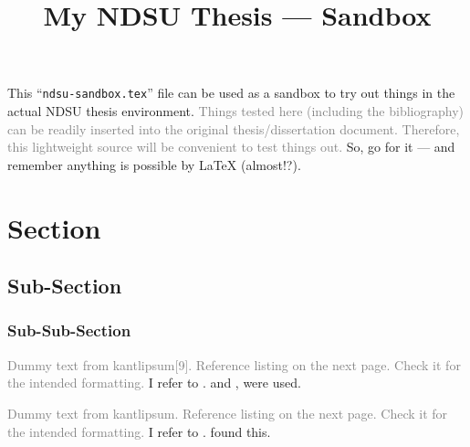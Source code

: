 \documentclass[12pt,mathdesign]{ndsu-thesis-2022}
\title{My NDSU Thesis --- Sandbox}
\newcommand\myspacing{1.9}%
\newcommand\makerefs{
\printbibliography[heading=subbibnumbered, title={References}]
} %
\begin{document}


This ``\texttt{ndsu-sandbox.tex}'' file can be used as a sandbox to try out things in the actual NDSU thesis environment. \textcolor{gray}{Things tested here (including the bibliography) can be readily inserted into the original thesis/dissertation document. Therefore, this lightweight source will be convenient to test things out.} So, go for it --- and remember anything is possible by \LaTeX{} (almost!?).

\section{Section}
\subsection{Sub-Section}
\subsubsection{Sub-Sub-Section}

\textcolor{gray}{Dummy text from kantlipsum[9]. Reference listing on the next page. Check it for the intended formatting.} I refer to \cite{lamport94,kopka2004guide,baczkowski1990ndsu}. \kant[9] \cite{lamport94,kopka2004guide} and \cite{lamport94}, \cite{kopka2004guide} were used.  


\textcolor{gray}{Dummy text from kantlipsum. Reference listing on the next page. Check it for the intended formatting.} I refer to \cite{butin2009education, rudestam2014surviving, Goossens2008g,cassuto2010advising,pires2021teens}. \kant[9] \citet{rudestam2014surviving} found this. 

%
\makerefs
\end{document}
